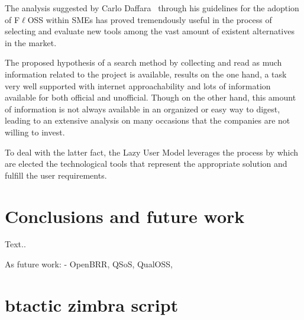 \documentclass[a4paper, 12pt]{book}
\begin{document}
\noindent The analysis suggested by Carlo Daffara~\cite{Daffara1} through his guidelines for the adoption of F$\ell$OSS within SMEs has proved tremendously useful in the process of selecting and evaluate new tools among the vast amount of existent alternatives in the market.\bigskip

\noindent The proposed hypothesis of a search method by collecting and read as much information related to the project is available, results on the one hand, a task very well supported with internet approachability and lots of information available for both official and unofficial. Though on the other hand, this amount of information is not always available in an organized or easy way to digest, leading to an extensive analysis on many occasions that the companies are not willing to invest.\bigskip

\noindent To deal with the latter fact, the Lazy User Model leverages the process by which are elected the technological tools that represent the appropriate solution and fulfill the user requirements. 





%
\chapter{Conclusions and future work}
\label{chap:conclusions}

Text..

As future work:
- OpenBRR, QSoS, QualOSS, 





%
{}



%
\appendix
\chapter{btactic zimbra script}
\label{app:appendix1}
\end{document}
